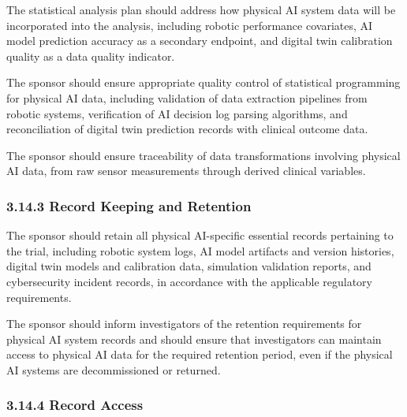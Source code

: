 \begin{description}[leftmargin=2.5cm,style=sameline]

\item[(a)] The statistical analysis plan should address how physical AI system data will be incorporated into the analysis, including robotic performance covariates, AI model prediction accuracy as a secondary endpoint, and digital twin calibration quality as a data quality indicator.

\item[(b)] The sponsor should ensure appropriate quality control of statistical programming for physical AI data, including validation of data extraction pipelines from robotic systems, verification of AI decision log parsing algorithms, and reconciliation of digital twin prediction records with clinical outcome data.

\item[(c)] The sponsor should ensure traceability of data transformations involving physical AI data, from raw sensor measurements through derived clinical variables.

\end{description}

\subsubsection{3.14.3 Record Keeping and Retention}

\begin{description}[leftmargin=2.5cm,style=sameline]

\item[(a)] The sponsor should retain all physical AI-specific essential records pertaining to the trial, including robotic system logs, AI model artifacts and version histories, digital twin models and calibration data, simulation validation reports, and cybersecurity incident records, in accordance with the applicable regulatory requirements.

\item[(b)] The sponsor should inform investigators of the retention requirements for physical AI system records and should ensure that investigators can maintain access to physical AI data for the required retention period, even if the physical AI systems are decommissioned or returned.

\end{description}

\subsubsection{3.14.4 Record Access}

